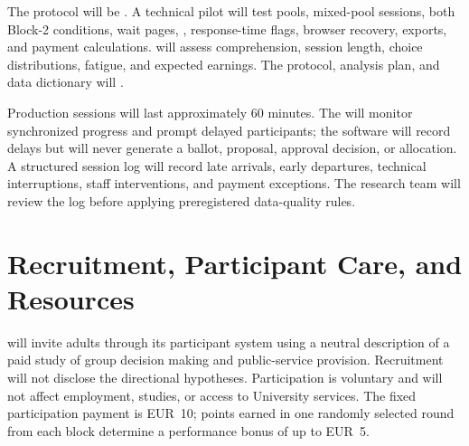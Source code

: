 \documentclass[11pt,a4paper]{article}
\begin{document}
The protocol will be . A technical pilot will test  pools, mixed-pool sessions, both Block-2 conditions, wait pages, , response-time flags, browser recovery, exports, and payment calculations.  will assess comprehension, session length, choice distributions, fatigue, and expected earnings.  The protocol, analysis plan, and data dictionary will .

Production sessions will last approximately 60 minutes. The  will monitor synchronized progress and prompt delayed participants; the software will record delays but will never generate a ballot, proposal, approval decision, or allocation. A structured session log will record late arrivals, early departures, technical interruptions, staff interventions, and payment exceptions. The research team will review the log before applying preregistered data-quality rules.

\section{Recruitment, Participant Care, and Resources}

 will invite adults through its participant system using a neutral description of a paid study of group decision making and public-service provision. Recruitment will not disclose the directional hypotheses. Participation is voluntary and will not affect employment, studies, or access to University services. The fixed participation payment is EUR~10; points earned in one randomly selected round from each block determine a performance bonus of up to EUR~5.
\end{document}
